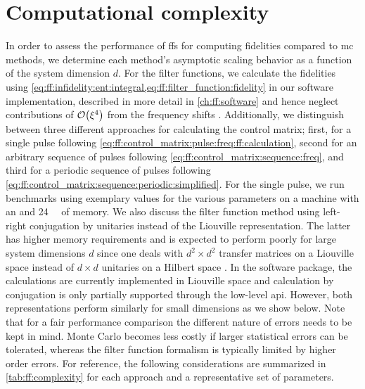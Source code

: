 \section{Computational complexity}\label{sec:ff:performance:complexity}
In order to assess the performance of \glspl{ff} for computing fidelities compared to \gls{mc} methods, we determine each method's asymptotic scaling behavior as a function of the system dimension $d$.
For the filter functions, we calculate the fidelities using \cref{eq:ff:infidelity:ent:integral,eq:ff:filter_function:fidelity} in our software implementation, described in more detail in \cref{ch:ff:software} and hence neglect contributions of $\order{\xi^4}$ from the frequency shifts \freqshifts.
Additionally, we distinguish between three different approaches for calculating the control matrix; first, for a single pulse following \cref{eq:ff:control_matrix:pulse:freq:ff:calculation}, second for an arbitrary sequence of pulses following \cref{eq:ff:control_matrix:sequence:freq}, and third for a periodic sequence of pulses following \cref{eq:ff:control_matrix:sequence:periodic:simplified}.
For the single pulse, we run benchmarks using exemplary values for the various parameters on a machine with an \slowprocessor and \qty{24}{\giga\byte} of memory.
We also discuss the filter function method using left-right conjugation by unitaries instead of the Liouville representation.
The latter has higher memory requirements and is expected to perform poorly for large system dimensions $d$ since one deals with $d^2\times d^2$ transfer matrices on a Liouville space \Lspace instead of $d\times d$ unitaries on a Hilbert space \Hspace.
In the software package, the calculations are currently implemented in Liouville space and calculation by conjugation is only partially supported through the low-level \gls{api}.
However, both representations perform similarly for small dimensions as we show below.
Note that for a fair performance comparison the different nature of errors needs to be kept in mind.
Monte Carlo becomes less costly if larger statistical errors can be tolerated, whereas the filter function formalism is typically limited by higher order errors.
For reference, the following considerations are summarized in \cref{tab:ff:complexity} for each approach and a representative set of parameters.

